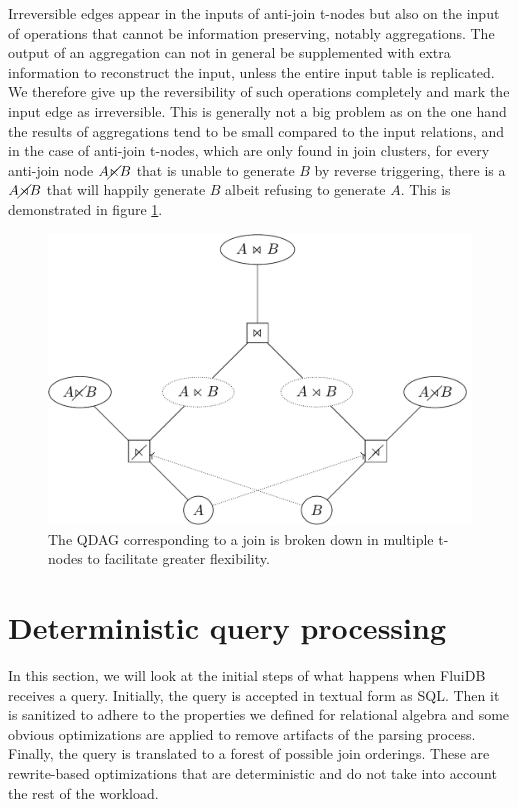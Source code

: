 Irreversible edges appear in the inputs of anti-join t-nodes but also
on the input of operations that cannot be information preserving,
notably aggregations. The output of an aggregation can not in general
be supplemented with extra information to reconstruct the input,
unless the entire input table is replicated. We therefore give up the
reversibility of such operations completely and mark the input edge
as irreversible. This is generally not a big problem as on the one
hand the results of aggregations tend to be small compared to the
input relations, and in the case of anti-join t-nodes, which are only
found in join clusters, for every anti-join node \(A \cancel\ltimes B\) that
is unable to generate \(B\) by reverse triggering, there is a \(A
\cancel\rtimes B\) that will happily generate \(B\) albeit refusing to
generate \(A\). This is demonstrated in figure \ref{fig:joinnetdir}.

\begin{figure}[H]
  \centering
  \includegraphics[width=.9\linewidth]{./imgs/joinnetdir.pdf}
  \caption{\label{fig:joinnetdir}The QDAG corresponding to a join is
    broken down in multiple t-nodes to facilitate greater
    flexibility.}
\end{figure}

\section{Deterministic query processing}
\label{sec:query_processing}

In this section, we will look at the initial steps of what happens when
FluiDB receives a query. Initially, the query is accepted in textual
form as SQL. Then it is sanitized to adhere to the properties we
defined for relational algebra and some obvious optimizations are
applied to remove artifacts of the parsing process. Finally, the query
is translated to a forest of possible join orderings. These are
rewrite-based optimizations that are deterministic and do not take
into account the rest of the workload.

